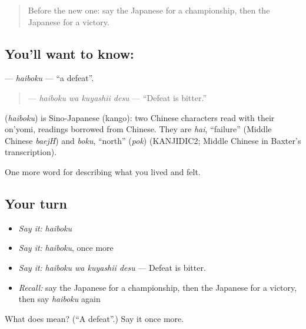 \label{lesson:JA-C506-haiboku}



\begin{quote}
Before the new one: say the Japanese for a championship, then the Japanese for a victory.
\end{quote}

\subsection*{You'll want to know: }
\textbf{} — \emph{haiboku} — \textquotedblleft{}a defeat\textquotedblright{}.

\begin{quote}
\textbf{ } — \emph{haiboku wa kuyashii desu} — \textquotedblleft{}Defeat is bitter.\textquotedblright{}
\end{quote}

\begin{cousinweb}
\textbf{} (\emph{haiboku}) is Sino-Japanese (kango): two Chinese characters read with their on'yomi, readings borrowed from Chinese. They are \emph{hai}, \textquotedblleft{}failure\textquotedblright{} (Middle Chinese \emph{baejH}) and \emph{boku}, \textquotedblleft{}north\textquotedblright{} (\emph{pok}) (KANJIDIC2; Middle Chinese in Baxter's transcription).
\end{cousinweb}

\begin{grammarlens}[title={What you've built}]
One more word for describing what you lived and felt.
\end{grammarlens}

\subsection*{Your turn}
\begin{itemize}
\raggedright
  \item \emph{Say it:} \emph{haiboku}
  \item \emph{Say it:} \emph{haiboku}, once more
  \item \emph{Say it:} \emph{haiboku wa kuyashii desu} — Defeat is bitter.
  \item \emph{Recall:} say the Japanese for a championship, then the Japanese for a victory, then say \emph{haiboku} again
\end{itemize}

\begin{tcolorbox}[breakable,colback=teal!4,colframe=teal!35!black,title={Before you move on}]
What does  mean? (\textquotedblleft{}A defeat\textquotedblright{}.) Say it once more.
\end{tcolorbox}
